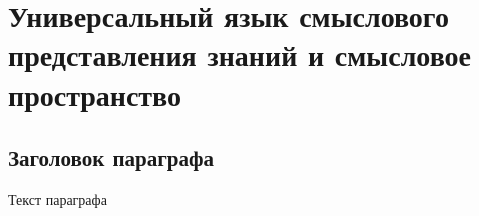 
\chapter{Универсальный язык смыслового представления знаний и смысловое пространство}
\label{chapter_sc_code}


\section{Заголовок параграфа}
Текст параграфа

%